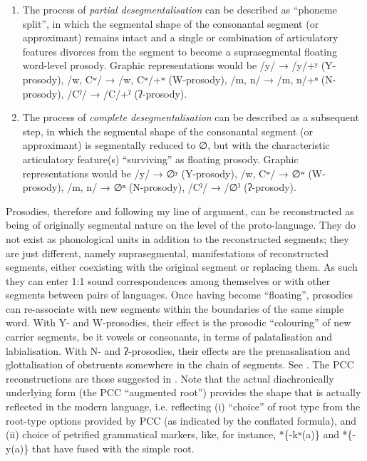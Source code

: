 \documentclass[output=paper]{langscibook}
\begin{document}
\begin{enumerate}
\item The process of \textit{partial desegmentalisation} can be described as ``phoneme split'', in which the segmental shape of the consonantal segment (or approximant) remains intact and a single or combination of articulatory features divorces from the segment to become a suprasegmental floating word-level prosody. Graphic representations would be /y/ → /y/+ʸ (Y-prosody), /w, Cʷ/ → /w, Cʷ/+ʷ (W-prosody), /m, n/ → /m, n/+ⁿ (N-prosody), /Cˀ/ → /C/+ˀ (ʔ-prosody).
\item The process of \textit{complete desegmentalisation} can be described as a subsequent step, in which the segmental shape of the consonantal segment (or approximant) is segmentally reduced to ∅, but with the characteristic articulatory feature(s) ``surviving'' as floating prosody. Graphic representations would be /y/ → ∅ʸ (Y-prosody), /w, Cʷ/ → ∅ʷ (W-prosody), /m, n/ → ∅ⁿ (N-prosody), /Cˀ/ → /∅ˀ (ʔ-prosody).
\end{enumerate}

Prosodies, therefore and following my line of argument, can be reconstructed as being of originally segmental nature on the level of the proto-language. They do not exist as phonological units in addition to the reconstructed segments; they are just different, namely suprasegmental, manifestations of reconstructed segments, either coexisting with the original segment or replacing them. As such they can enter 1:1 sound correspondences among themselves or with other segments between pairs of languages. Once having become ``floating'', prosodies can re-associate with new segments within the boundaries of the same simple word. With Y- and W-prosodies, their effect is the prosodic ``colouring'' of new carrier segments, be it vowels or consonants, in terms of palatalisation and labialisation.
With N- and ʔ-prosodies, their effects are the prenasalisation and glottalisation of obstruents somewhere in the chain of segments. See . The PCC reconstructions are those suggested in \citet{Wolffinpressb}. Note that the actual diachronically underlying form (the PCC ``augmented root'') provides the shape that is actually reflected in the modern language, i.e. reflecting (i) ``choice'' of root type from the root-type options provided by PCC (as indicated by the conflated formula), and (ii) choice of petrified grammatical markers, like, for instance, *\{-kʷ(a)\} and *\{-y(a)\} that have fused with the simple root.
\end{document}
